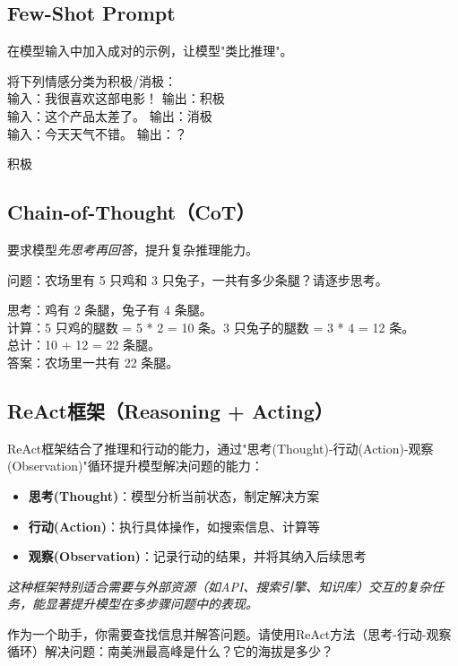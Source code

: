 \documentclass[12pt]{ctexart}
\begin{document}
\subsection{Few-Shot Prompt}
在模型输入中加入成对的示例，让模型"类比推理"。
\begin{promptbox}
将下列情感分类为积极/消极：\\
输入：我很喜欢这部电影！ 输出：积极\\
输入：这个产品太差了。 输出：消极\\
输入：今天天气不错。 输出：？
\end{promptbox}
\begin{outputbox}
积极
\end{outputbox}

\subsection{Chain-of-Thought（CoT）}
要求模型\emph{先思考再回答}，提升复杂推理能力。
\begin{promptbox}
问题：农场里有 5 只鸡和 3 只兔子，一共有多少条腿？请逐步思考。
\end{promptbox}
\begin{outputbox}
思考：鸡有 2 条腿，兔子有 4 条腿。\\
计算：5 只鸡的腿数 = 5 * 2 = 10 条。3 只兔子的腿数 = 3 * 4 = 12 条。\\
总计：10 + 12 = 22 条腿。\\
答案：农场里一共有 22 条腿。
\end{outputbox}

\subsection{ReAct框架（Reasoning + Acting）}
ReAct框架结合了推理和行动的能力，通过"思考(Thought)-行动(Action)-观察(Observation)"循环提升模型解决问题的能力：
\begin{itemize}
  \item \textbf{思考(Thought)}：模型分析当前状态，制定解决方案
  \item \textbf{行动(Action)}：执行具体操作，如搜索信息、计算等
  \item \textbf{观察(Observation)}：记录行动的结果，并将其纳入后续思考
\end{itemize}

\textit{这种框架特别适合需要与外部资源（如API、搜索引擎、知识库）交互的复杂任务，能显著提升模型在多步骤问题中的表现。}

\begin{promptbox}
作为一个助手，你需要查找信息并解答问题。请使用ReAct方法（思考-行动-观察循环）解决问题：南美洲最高峰是什么？它的海拔是多少？
\end{promptbox}
\end{document}
